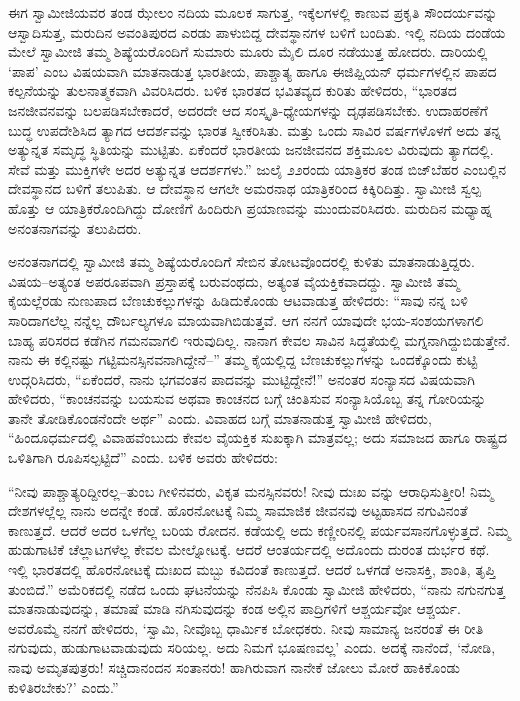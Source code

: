 ಈಗ ಸ್ವಾಮೀಜಿಯವರ ತಂಡ ಝೇಲಂ ನದಿಯ ಮೂಲಕ ಸಾಗುತ್ತ, ಇಕ್ಕೆಲಗಳಲ್ಲಿ ಕಾಣುವ ಪ್ರಕೃತಿ ಸೌಂದರ್ಯವನ್ನು ಆಸ್ವಾದಿಸುತ್ತ, ಮರುದಿನ ಅವಂತಿಪುರದ ಎರಡು ಪಾಳುಬಿದ್ದ ದೇವಸ್ಥಾನಗಳ ಬಳಿಗೆ ಬಂದಿತು. ಇಲ್ಲಿ ನದಿಯ ದಂಡೆಯ ಮೇಲೆ ಸ್ವಾಮೀಜಿ ತಮ್ಮ ಶಿಷ್ಯೆಯರೊಂದಿಗೆ ಸುಮಾರು ಮೂರು ಮೈಲಿ ದೂರ ನಡೆಯುತ್ತ ಹೋದರು. ದಾರಿಯಲ್ಲಿ ‘ಪಾಪ’ ಎಂಬ ವಿಷಯವಾಗಿ ಮಾತನಾಡುತ್ತ ಭಾರತೀಯ, ಪಾಶ್ಚಾತ್ಯ ಹಾಗೂ ಈಜಿಪ್ಷಿಯನ್ ಧರ್ಮಗಳಲ್ಲಿನ ಪಾಪದ ಕಲ್ಪನೆಯನ್ನು ತುಲನಾತ್ಮಕವಾಗಿ ವಿವರಿಸಿದರು. ಬಳಿಕ ಭಾರತದ ಭವಿತವ್ಯದ ಕುರಿತು ಹೇಳಿದರು, “ಭಾರತದ ಜನಜೀವನವನ್ನು ಬಲಪಡಿಸಬೇಕಾದರೆ, ಅದರದೇ ಆದ ಸಂಸ್ಕೃತಿ-ಧ್ಯೇಯಗಳನ್ನು ದೃಢಪಡಿಸಬೇಕು. ಉದಾಹರಣೆಗೆ ಬುದ್ಧ ಉಪದೇಶಿಸಿದ ತ್ಯಾಗದ ಆದರ್ಶವನ್ನು ಭಾರತ ಸ್ವೀಕರಿಸಿತು. ಮತ್ತು ಒಂದು ಸಾವಿರ ವರ್ಷಗಳೊಳಗೆ ಅದು ತನ್ನ ಅತ್ಯುನ್ನತ ಸಮೃದ್ಧ ಸ್ಥಿತಿಯನ್ನು ಮುಟ್ಟಿತು. ಏಕೆಂದರೆ ಭಾರತೀಯ ಜನಜೀವನದ ಶಕ್ತಿಮೂಲ ವಿರುವುದು ತ್ಯಾಗದಲ್ಲಿ. ಸೇವೆ ಮತ್ತು ಮುಕ್ತಿಗಳೇ ಅದರ ಅತ್ಯುನ್ನತ ಆದರ್ಶಗಳು.” ಜುಲೈ ೨೨ರಂದು ಯಾತ್ರಿಕರ ತಂಡ ಬಿಜ್​ಬೆಹರ ಎಂಬಲ್ಲಿನ ದೇವಸ್ಥಾನದ ಬಳಿಗೆ ತಲುಪಿತು. ಆ ದೇವಸ್ಥಾನ ಆಗಲೇ ಅಮರನಾಥ ಯಾತ್ರಿಕರಿಂದ ಕಿಕ್ಕಿರಿದಿತ್ತು. ಸ್ವಾಮೀಜಿ ಸ್ವಲ್ಪ ಹೊತ್ತು ಆ ಯಾತ್ರಿಕರೊಂದಿಗಿದ್ದು ದೋಣಿಗೆ ಹಿಂದಿರುಗಿ ಪ್ರಯಾಣವನ್ನು ಮುಂದುವರಿಸಿದರು. ಮರುದಿನ ಮಧ್ಯಾಹ್ನ ಅನಂತನಾಗವನ್ನು ತಲುಪಿದರು.

ಅನಂತನಾಗದಲ್ಲಿ ಸ್ವಾಮೀಜಿ ತಮ್ಮ ಶಿಷ್ಯೆಯರೊಂದಿಗೆ ಸೇಬಿನ ತೋಟವೊಂದರಲ್ಲಿ ಕುಳಿತು ಮಾತನಾಡುತ್ತಿದ್ದರು. ವಿಷಯ–ಅತ್ಯಂತ ಅಪರೂಪವಾಗಿ ಪ್ರಸ್ತಾಪಕ್ಕೆ ಬರುವಂಥದು, ಅತ್ಯಂತ ವೈಯಕ್ತಿಕವಾದದ್ದು. ಸ್ವಾಮೀಜಿ ತಮ್ಮ ಕೈಯಲ್ಲೆರಡು ನುಣುಪಾದ ಬೆಣಚುಕಲ್ಲುಗಳನ್ನು ಹಿಡಿದುಕೊಂಡು ಆಟವಾಡುತ್ತ ಹೇಳಿದರು: “ಸಾವು ನನ್ನ ಬಳಿ ಸಾರಿದಾಗಲೆಲ್ಲ ನನ್ನೆಲ್ಲ ದೌರ್ಬಲ್ಯಗಳೂ ಮಾಯವಾಗಿಬಿಡುತ್ತವೆ. ಆಗ ನನಗೆ ಯಾವುದೇ ಭಯ-ಸಂಶಯಗಳಾಗಲಿ ಬಾಹ್ಯ ಪರಿಸರದ ಕಡೆಗಿನ ಗಮನವಾಗಲಿ ಇರುವುದಿಲ್ಲ. ನಾನಾಗ ಕೇವಲ ಸಾವಿನ ಸಿದ್ಧತೆಯಲ್ಲಿ ಮಗ್ನನಾಗಿದ್ದುಬಿಡುತ್ತೇನೆ. ನಾನು ಈ ಕಲ್ಲಿನಷ್ಟು ಗಟ್ಟಿಮನಸ್ಸಿನವನಾಗಿದ್ದೇನೆ–” ತಮ್ಮ ಕೈಯಲ್ಲಿದ್ದ ಬೆಣಚುಕಲ್ಲುಗಳನ್ನು ಒಂದಕ್ಕೊಂದು ಕುಟ್ಟಿ ಉದ್ಗರಿಸಿದರು, “ಏಕೆಂದರೆ, ನಾನು ಭಗವಂತನ ಪಾದವನ್ನು ಮುಟ್ಟಿದ್ದೇನೆ!” ಅನಂತರ ಸಂನ್ಯಾಸದ ವಿಷಯವಾಗಿ ಹೇಳಿದರು, “ಕಾಂಚನವನ್ನು ಬಯಸುವ ಅಥವಾ ಕಾಂಚನದ ಬಗ್ಗೆ ಚಿಂತಿಸುವ ಸಂನ್ಯಾಸಿಯೊಬ್ಬ ತನ್ನ ಗೋರಿಯನ್ನು ತಾನೇ ತೋಡಿಕೊಂಡನೆಂದೇ ಅರ್ಥ” ಎಂದು. ವಿವಾಹದ ಬಗ್ಗೆ ಮಾತನಾಡುತ್ತ ಸ್ವಾಮೀಜಿ ಹೇಳಿದರು, “ಹಿಂದೂಧರ್ಮದಲ್ಲಿ ವಿವಾಹವೆಂಬುದು ಕೇವಲ ವೈಯಕ್ತಿಕ ಸುಖಕ್ಕಾಗಿ ಮಾತ್ರವಲ್ಲ; ಅದು ಸಮಾಜದ ಹಾಗೂ ರಾಷ್ಟ್ರದ ಒಳಿತಿಗಾಗಿ ರೂಪಿಸಲ್ಪಟ್ಟಿದೆ” ಎಂದು. ಬಳಿಕ ಅವರು ಹೇಳಿದರು:

“ನೀವು ಪಾಶ್ಚಾತ್ಯರಿದ್ದೀರಲ್ಲ–ತುಂಬ ಗೀಳಿನವರು, ವಿಕೃತ ಮನಸ್ಸಿನವರು! ನೀವು ದುಃಖ ವನ್ನು ಆರಾಧಿಸುತ್ತೀರಿ! ನಿಮ್ಮ ದೇಶಗಳಲ್ಲೆಲ್ಲ ನಾನು ಅದನ್ನೇ ಕಂಡೆ. ಹೊರನೋಟಕ್ಕೆ ನಿಮ್ಮ ಸಾಮಾಜಿಕ ಜೀವನವು ಅಟ್ಟಹಾಸದ ನಗುವಿನಂತೆ ಕಾಣುತ್ತದೆ. ಆದರೆ ಅದರ ಒಳಗೆಲ್ಲ ಬರಿಯ ರೋದನ. ಕಡೆಯಲ್ಲಿ ಅದು ಕಣ್ಣೀರಿನಲ್ಲಿ ಪರ್ಯವಸಾನಗೊಳ್ಳುತ್ತದೆ. ನಿಮ್ಮ ಹುಡುಗಾಟಿಕೆ ಚೆಲ್ಲಾಟಗಳೆಲ್ಲ ಕೇವಲ ಮೇಲ್ನೋಟಕ್ಕೆ. ಆದರೆ ಆಂತರ್ಯದಲ್ಲಿ ಅದೊಂದು ದುರಂತ ದುರ್ಭರ ಕಥೆ. ಇಲ್ಲಿ ಭಾರತದಲ್ಲಿ ಹೊರನೋಟಕ್ಕೆ ದುಃಖದ ಮಬ್ಬು ಕವಿದಂತೆ ಕಾಣುತ್ತದೆ. ಆದರೆ ಒಳಗಡೆ ಅನಾಸಕ್ತಿ, ಶಾಂತಿ, ತೃಪ್ತಿ ತುಂಬಿದೆ.” ಅಮೆರಿಕದಲ್ಲಿ ನಡೆದ ಒಂದು ಘಟನೆಯನ್ನು ನೆನಪಿಸಿ ಕೊಂಡು ಸ್ವಾಮೀಜಿ ಹೇಳಿದರು, “ನಾನು ನಗುನಗುತ್ತ ಮಾತನಾಡುವುದನ್ನು, ತಮಾಷೆ ಮಾಡಿ ನಗಿಸುವುದನ್ನು ಕಂಡ ಅಲ್ಲಿನ ಪಾದ್ರಿಗಳಿಗೆ ಆಶ್ಚರ್ಯವೋ ಆಶ್ಚರ್ಯ. ಅವರೊಮ್ಮೆ ನನಗೆ ಹೇಳಿದರು, ‘ಸ್ವಾಮಿ, ನೀವೊಬ್ಬ ಧಾರ್ಮಿಕ ಬೋಧಕರು. ನೀವು ಸಾಮಾನ್ಯ ಜನರಂತೆ ಈ ರೀತಿ ನಗುವುದು, ಹುಡುಗಾಟವಾಡುವುದು ಸರಿಯಲ್ಲ. ಅದು ನಿಮಗೆ ಭೂಷಣವಲ್ಲ’ ಎಂದು. ಅದಕ್ಕೆ ನಾನೆಂದೆ, ‘ನೋಡಿ, ನಾವು ಅಮೃತಪುತ್ರರು! ಸಚ್ಚಿದಾನಂದನ ಸಂತಾನರು! ಹಾಗಿರುವಾಗ ನಾನೇಕೆ ಜೋಲು ಮೋರೆ ಹಾಕಿಕೊಂಡು ಕುಳಿತಿರಬೇಕು?’ ಎಂದು.”

